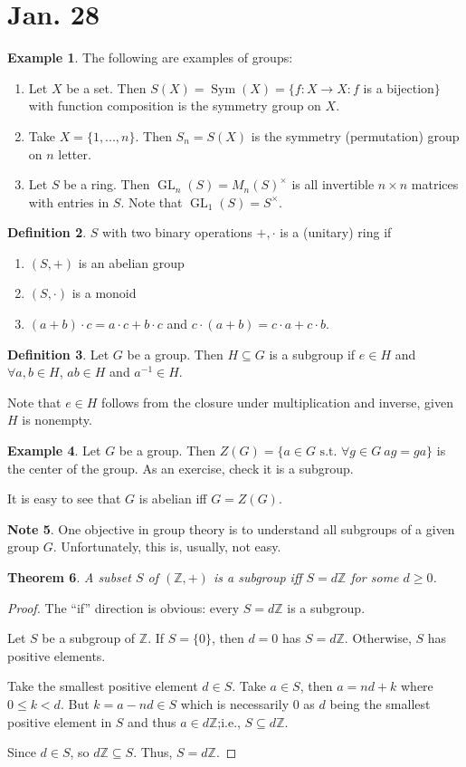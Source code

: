 \documentclass{amsart}
\newtheorem{thm}{Theorem}[section]
\theoremstyle{definition}
\newtheorem{definition}[thm]{Definition}
\newtheorem{example}[thm]{Example}
\newtheorem{note}[thm]{Note}
\newcommand{\Z}{\mathbb Z}
\newcommand{\st}{\text{ s.t. }}
\DeclareMathOperator{\Sym}{Sym}
\DeclareMathOperator{\GL}{GL}
\begin{document}
\section{Jan. 28}
\begin{example}
	The following are examples of groups:
	\begin{enumerate}
		\item Let $X$ be a set. Then $S(X)=\Sym(X)=\{f:X\to X: f $ is a bijection$\}$ with function composition is the symmetry group on $X$.
		\item Take $X=\{1,...,n\}$. Then $S_n=S(X)$ is the symmetry (permutation) group on $n$ letter.
		\item Let $S$ be a ring. Then $\GL_n(S)=M_n(S)^\times$ is all invertible $n\times n$ matrices with entries in $S$. Note that $\GL_1(S)=S^\times$.
	\end{enumerate}
\end{example}
\begin{definition}
	$S$ with two binary operations $+,\cdot$ is a (unitary) ring if\begin{enumerate}
		\item $(S,+)$ is an abelian group
		\item $(S,\cdot)$ is a monoid
		\item $(a+b)\cdot c=a\cdot c+b\cdot c$ and $c\cdot (a+b)=c\cdot a+c\cdot b$.
	\end{enumerate}
\end{definition}
\begin{definition}
	Let $G$ be a group. Then $H\subseteq G$ is a subgroup if $e\in H$ and $\forall a,b\in H$, $ab\in H$ and $a^{-1}\in H$.
	
	Note that $e\in H$ follows from the closure under multiplication and inverse, given $H$ is nonempty.	
\end{definition}
\begin{example}
	Let $G$ be a group. Then $Z(G)=\{a\in G\st \forall g\in G\  ag=ga\}$ is the center of the group. As an exercise, check it is a subgroup.
\end{example}
	It is easy to see that $G$ is abelian iff $G=Z(G)$.
\begin{note}
	One objective in group theory is to understand all subgroups of a given group $G$. Unfortunately, this is, usually, not easy.
\end{note}
\begin{thm}
	A subset $S$ of $(\Z,+)$ is a subgroup iff $S=d\Z$ for some $d\geq 0$.
\end{thm}
\begin{proof}
	The ``if'' direction is obvious: every $S=d\Z$ is a subgroup.
	
	Let $S$ be a subgroup of $\Z$. If $S=\{0\}$, then $d=0$ has $S=d\Z$. Otherwise, $S$ has positive elements.
	
	Take the smallest positive element $d\in S$. Take $a\in S$, then $a=nd+k$ where $0\leq k<d$. But $k=a-nd\in S$ which is necessarily $0$ as $d$ being the smallest positive element in $S$ and thus $a\in d\Z$;i.e., $S\subseteq d\Z$.
	
	Since $d\in S$, so $d\Z\subseteq S$. Thus, $S=d\Z$.
\end{proof}
\end{document}
